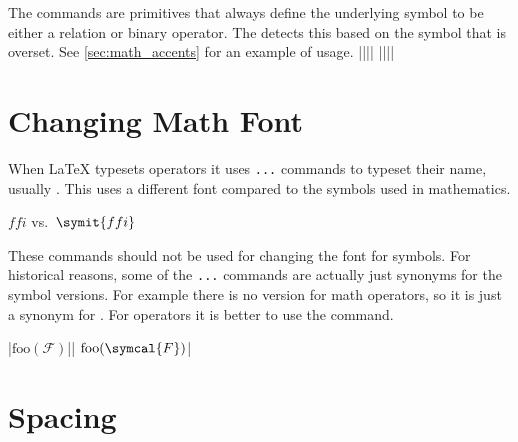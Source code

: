 The commands are primitives that always define the underlying symbol to be
either a relation or binary operator. The  detects this based on
the symbol that is overset. See \autoref{sec:math_accents} for an example of
usage.
\chto||||
\chto||||

\section{Changing Math Font}

When \LaTeX{} typesets operators it uses \texttt{\math...} commands
to typeset their name, usually . This uses a different font
compared to the symbols used in mathematics.
\begin{example}
\(\mathit{ffi}\) vs.\
  \(\symit{ffi}\)
\end{example}
These commands should not be used for changing the font for symbols. For
historical reasons, some of the \texttt{\math...} commands are
actually just synonyms for the symbol versions. For example there is no
\csi{mathscr} version for math operators, so it is just a synonym for
\csi{symscr}. For operators it is better to use the 
command.

\vchto|\(\mathrm{foo}(\mathcal{F})\)||\DeclareMathOperator{\foo}{foo}
\(\foo(\symcal{F})\)|

\section{Spacing}

